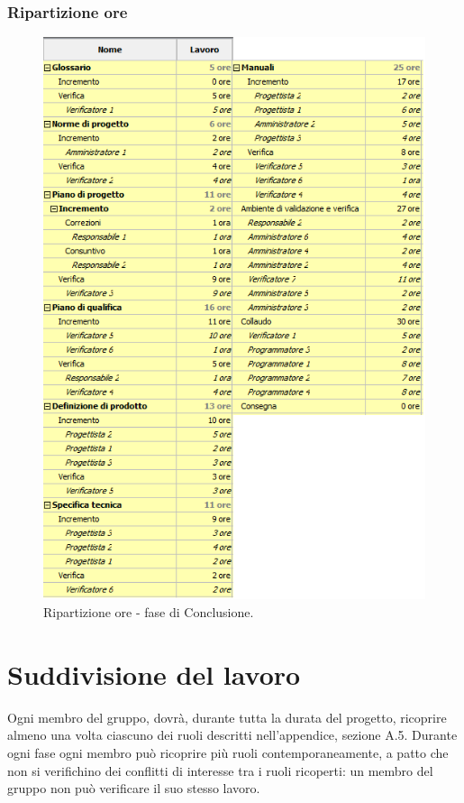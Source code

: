 \documentclass[a4paper]{article}
\begin{document}
			\subsubsection{Ripartizione ore}
				\begin{figure}[H]
					\centering
					\includegraphics[width=\textwidth]{ro_conclusione}
					\caption{Ripartizione ore - fase di Conclusione.}
				\end{figure}

	\newpage 
	\section{Suddivisione del lavoro}
		Ogni membro del gruppo, dovrà, durante tutta la durata del progetto, ricoprire almeno una volta ciascuno dei
		ruoli descritti nell'appendice, sezione A.5. Durante ogni fase ogni membro può ricoprire
		più ruoli contemporaneamente, a patto che non si verifichino dei conflitti di interesse tra i ruoli ricoperti: 
		un membro del gruppo non può verificare il suo stesso lavoro.
		
\end{document}
